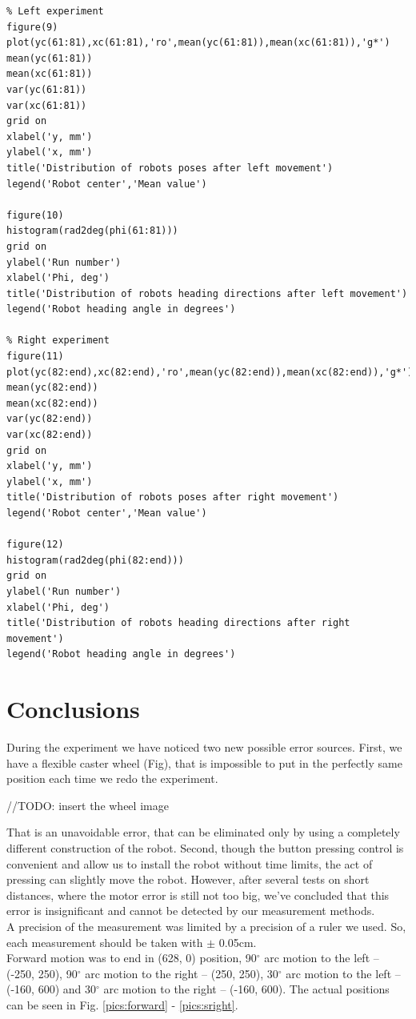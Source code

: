 \documentclass[a4paper, 12pt]{article}
\begin{document}
\begin{lstlisting}
% Left experiment
figure(9)
plot(yc(61:81),xc(61:81),'ro',mean(yc(61:81)),mean(xc(61:81)),'g*')
mean(yc(61:81))
mean(xc(61:81))
var(yc(61:81))
var(xc(61:81))
grid on
xlabel('y, mm')
ylabel('x, mm')
title('Distribution of robots poses after left movement')
legend('Robot center','Mean value')

figure(10)
histogram(rad2deg(phi(61:81)))
grid on
ylabel('Run number')
xlabel('Phi, deg')
title('Distribution of robots heading directions after left movement')
legend('Robot heading angle in degrees')

% Right experiment
figure(11)
plot(yc(82:end),xc(82:end),'ro',mean(yc(82:end)),mean(xc(82:end)),'g*')
mean(yc(82:end))
mean(xc(82:end))
var(yc(82:end))
var(xc(82:end))
grid on
xlabel('y, mm')
ylabel('x, mm')
title('Distribution of robots poses after right movement')
legend('Robot center','Mean value')

figure(12)
histogram(rad2deg(phi(82:end)))
grid on
ylabel('Run number')
xlabel('Phi, deg')
title('Distribution of robots heading directions after right movement')
legend('Robot heading angle in degrees')
\end{lstlisting}

\section{Conclusions}
During the experiment we have noticed two new possible error sources. First, we have a flexible caster wheel (Fig), that is impossible to put in the perfectly same position each time we redo the experiment. 

//TODO: insert the wheel image

That is an unavoidable error, that can be eliminated only by using a completely different construction of the robot. Second, though the button pressing control is convenient and allow us to install the robot without time limits, the act of pressing can slightly move the robot. However, after several tests on short distances, where the motor error is still not too big, we've concluded that this error is insignificant and cannot be detected by our measurement methods. \\

A precision of the measurement was limited by a precision of a ruler we used. So, each measurement should be taken with $\pm$ 0.05cm.\\
Forward motion was to end in (628, 0) position, 90$^{\circ}$ arc motion to the left -- (-250, 250), 90$^{\circ}$ arc motion to the right -- (250, 250), 30$^{\circ}$ arc motion to the left -- (-160, 600) and 30$^{\circ}$ arc motion to the right -- (-160, 600). The actual positions can be seen in Fig. \ref{pics:forward} - \ref{pics:sright}.
\end{document}
